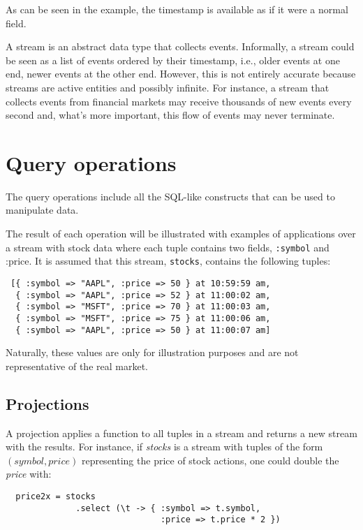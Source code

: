 \documentclass{report}
\newcommand{\tuple}[1]{$(#1)$}
\begin{document}
As can be seen in the example, the timestamp is available as if it
were a normal field.

A stream is an abstract data type that collects events. Informally, a
stream could be seen as a list of events ordered by their timestamp,
i.e., older events at one end, newer events at the other end. However,
this is not entirely accurate because streams are active entities and
possibly infinite. For instance, a stream that collects events from
financial markets may receive thousands of new events every second
and, what's more important, this flow of events may never terminate.

\section{Query operations}
\label{sec:query-operations}
The query operations include all the SQL-like constructs that can be
used to manipulate data.

The result of each operation will be illustrated with examples of
applications over a stream with stock data where each tuple contains
two fields, \verb=:symbol= and :price. It is assumed that this stream,
\verb=stocks=, contains the following tuples:

\begin{verbatim}
 [{ :symbol => "AAPL", :price => 50 } at 10:59:59 am,
  { :symbol => "AAPL", :price => 52 } at 11:00:02 am,
  { :symbol => "MSFT", :price => 70 } at 11:00:03 am,
  { :symbol => "MSFT", :price => 75 } at 11:00:06 am,
  { :symbol => "AAPL", :price => 50 } at 11:00:07 am]
\end{verbatim}

Naturally, these values are only for illustration purposes and are not
representative of the real market.

\subsection{Projections}
\label{sec:projections}
A projection applies a function to all tuples in a stream and returns
a new stream with the results. For instance, if \emph{stocks} is a
stream with tuples of the form \tuple{symbol, price} representing the
price of stock actions, one could double the \emph{price} with:

\begin{verbatim}
  price2x = stocks
              .select (\t -> { :symbol => t.symbol,
                               :price => t.price * 2 })
\end{verbatim}
\end{document}
